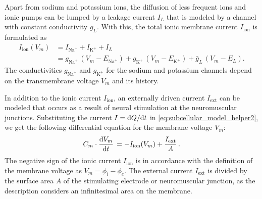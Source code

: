 Apart from sodium and potassium ions, the diffusion of less frequent ions and ionic pumps can be lumped by a leakage current $I_L$ that is modeled by a channel with constant conductivity $\bar{g}_L$.
With this, the total ionic membrane current $I_\text{ion}$ is formulated as
%
\begin{subequations}
\begin{align}\label{eq:subcellular_model_helper4}
  I_\text{ion}(V_m)  &= I_{\text{Na}^{+}} + I_{\text{K}^{+}} + I_L \\
  & = g_{\text{Na}^{+}}\,(V_m - E_{\text{Na}^{+}}) + g_{\text{K}^{+}}\,(V_m - E_{\text{K}^{+}}) + \bar{g}_L\,(V_m - E_L). \label{eq:subcellular_model_helper5}
\end{align}
\end{subequations}
%
The conductivities $g_{\text{Na}^{+}}$ and $g_{\text{K}^{+}}$ for the sodium and potassium channels depend on the transmembrane voltage $V_m$ and its history.

In addition to the ionic current $I_\text{ion}$, an externally driven current $I_\text{ext}$ can be modeled that occurs as a result of neural stimulation at the neuromuscular junctions. Substituting the current $I=\d Q / \d t$ in \cref{eq:subcellular_model_helper2}, we get the following differential equation for the membrane voltage $V_m$:
\begin{align}\label{eq:subcellular_model_helper3}
  C_m \cdot \d{V_m}{t} = -I_\text{ion}(V_m) + \dfrac{I_\text{ext}}{A}.
\end{align}
%
The negative sign of the ionic current $I_\text{ion}$ is in accordance with the definition of the membrane voltage as $V_m=\phi_i-\phi_e$. The external current $I_\text{ext}$ is divided by the surface area $A$ of the stimulating electrode or neuromuscular junction, as the description considers an infinitesimal area on the membrane.

